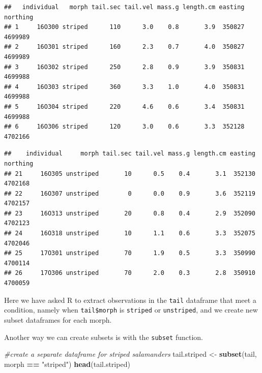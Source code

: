 \documentclass[
]{book}
\newenvironment{Shaded}{\begin{snugshade}}{\end{snugshade}}
\newcommand{\CommentTok}[1]{\textcolor[rgb]{0.56,0.35,0.01}{\textit{#1}}}
\newcommand{\FunctionTok}[1]{\textcolor[rgb]{0.13,0.29,0.53}{\textbf{#1}}}
\newcommand{\NormalTok}[1]{#1}
\newcommand{\OtherTok}[1]{\textcolor[rgb]{0.56,0.35,0.01}{#1}}
\newcommand{\SpecialCharTok}[1]{\textcolor[rgb]{0.81,0.36,0.00}{\textbf{#1}}}
\newcommand{\StringTok}[1]{\textcolor[rgb]{0.31,0.60,0.02}{#1}}
\begin{document}
\begin{verbatim}
##   individual   morph tail.sec tail.vel mass.g length.cm easting northing
## 1     16O300 striped      110      3.0    0.8       3.9  350827  4699989
## 2     16O301 striped      160      2.3    0.7       4.0  350827  4699989
## 3     16O302 striped      250      2.8    0.9       3.9  350831  4699988
## 4     16O303 striped      360      3.3    1.0       4.0  350831  4699988
## 5     16O304 striped      220      4.6    0.6       3.4  350831  4699988
## 6     16O306 striped      120      3.0    0.6       3.3  352128  4702166
\end{verbatim}

\begin{Shaded}
\end{Shaded}

\begin{verbatim}
##    individual     morph tail.sec tail.vel mass.g length.cm easting northing
## 21     16O305 unstriped       10      0.5    0.4       3.1  352130  4702168
## 22     16O307 unstriped        0      0.0    0.9       3.6  352119  4702157
## 23     16O313 unstriped       20      0.8    0.4       2.9  352090  4702123
## 24     16O318 unstriped       10      1.1    0.6       3.3  352075  4702046
## 25     17O301 unstriped       70      1.9    0.5       3.3  350990  4700114
## 26     17O306 unstriped       70      2.0    0.3       2.8  350910  4700059
\end{verbatim}

Here we have asked R to extract observations in the \texttt{tail} dataframe that meet a condition, namely when \texttt{tail\$morph} is \texttt{striped} or \texttt{unstriped}, and we create new subset dataframes for each morph.

Another way we can create subsets is with the \texttt{subset} function.

\begin{Shaded}
\begin{Highlighting}[]
\CommentTok{\#create a separate dataframe for striped salamanders}
\NormalTok{tail.striped }\OtherTok{\textless{}{-}} \FunctionTok{subset}\NormalTok{(tail, morph }\SpecialCharTok{==} \StringTok{"striped"}\NormalTok{)}
\FunctionTok{head}\NormalTok{(tail.striped)}
\end{Highlighting}
\end{Shaded}
\end{document}
